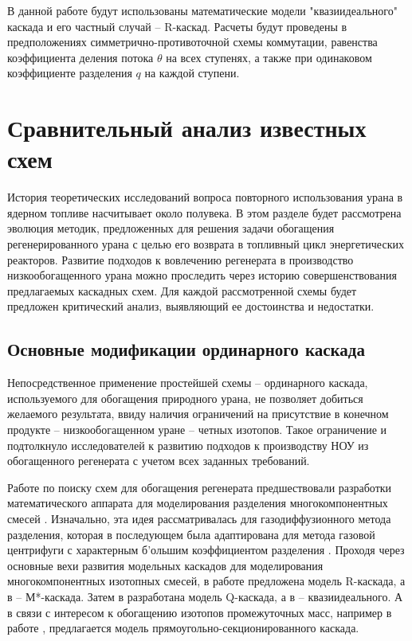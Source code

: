 В данной работе будут использованы математические модели "квазиидеального" каскада и его частный случай -- R-каскад. Расчеты будут проведены в предположениях симметрично-противоточной схемы коммутации, равенства коэффициента деления потока $\theta$ на всех ступенях, а также при одинаковом коэффициенте разделения $q$ на каждой ступени.

\section{Сравнительный анализ известных схем}

История теоретических исследований вопроса повторного использования урана в ядерном топливе насчитывает около полувека.
В этом разделе будет рассмотрена эволюция методик, предложенных для решения задачи обогащения регенерированного урана с целью его возврата в топливный цикл энергетических реакторов.
Развитие подходов к вовлечению регенерата в производство низкообогащенного урана можно проследить через историю совершенствования предлагаемых каскадных схем.
Для каждой рассмотренной схемы будет предложен критический анализ, выявляющий ее достоинства и недостатки.

\subsection{Основные модификации ординарного каскада}

Непосредственное применение простейшей схемы -- ординарного каскада, используемого для обогащения природного урана, не позволяет добиться желаемого результата, ввиду наличия ограничений на присутствие в конечном продукте -- низкообогащенном уране -- четных изотопов. Такое ограничение и подтолкнуло исследователей к развитию подходов к производству НОУ из обогащенного регенерата с учетом всех заданных требований.

Работе по поиску схем для обогащения регенерата предшествовали разработки математического аппарата для моделирования разделения многокомпонентных смесей \cite{delagarzaMulticomponentIsotopeSeparation1961}. Изначально, эта идея рассматривалась для газодиффузионного метода разделения, которая в последующем была адаптирована для метода газовой центрифуги с характерным б'ольшим коэффициентом разделения \cite{yamamotoMulticomponentIsotopeSeparating1978}.
Проходя через основные вехи развития модельных каскадов для моделирования многокомпонентных изотопных смесей, в работе \cite{delagarzaMulticomponentIsotopeSeparation1961} предложена модель R-каскада, а в \cite{levin1963} -- М*-каскада. Затем в \cite{minenkoTeoriiKaskadovDlya1965} разработана модель Q-каскада, а в \cite{sazykinKvaziidealnyeKaskadyDlya2000} -- квазиидеального. А в связи с интересом к обогащению изотопов промежуточных масс, например в работе \cite{kolokoltsovDesignCascadesSeparating1970}, предлагается модель прямоугольно-секционированного каскада.


